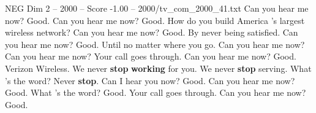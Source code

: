 \begin{textsample}{NEG Dim 2 – 2000 – Score -1.00 – 2000/tv\_com\_2000\_41.txt}  \label{ex:f2_neg_018}
Can you hear me now?
Good.
Can you hear me now?
Good.
How do you build America 's largest wireless network?
Can you hear me now?
Good.
By never being satisfied.
Can you hear me now?
Good.
Until no matter where you go.
Can you hear me now?
Can you hear me now?
Your call goes through.
Can you hear me now?
Good.
Verizon Wireless.
We never \textbf{stop} \textbf{working} for you.
We never \textbf{stop} serving.
What 's the word?
Never \textbf{stop}.
Can I hear you now?
Good.
Can you hear me now?
Good.
What 's the word?
Good.
Your call goes through.
Can you hear me now?
Good.

\end{textsample}
